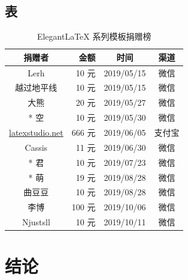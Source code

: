 \subsection{表}
\lipsum[3]
\begin{table}[!htbp]
    \centering
    \caption{Elegant\LaTeX{} 系列模板捐赠榜}
    \begin{tabular}{crcc}
      \toprule
      捐赠者   & 金额 & 时间 & 渠道 \\
      \midrule
      Lerh  & 10 元  & 2019/05/15 & 微信 \\
      越过地平线 & 10 元    & 2019/05/15 & 微信 \\
      大熊 &  20 元 & 2019/05/27 & 微信 \\
      * 空 & 10 元 & 2019/05/30 & 微信\\
      \href{http://www.latexstudio.net/}{latexstudio.net} & 666 元 & 2019/06/05 & 支付宝\\
      Cassis & 11 元 & 2019/06/30 & 微信\\
      * 君 & 10 元 & 2019/07/23 & 微信\\
      * 萌 & 19 元 & 2019/08/28 & 微信 \\
      曲豆豆 & 10 元 & 2019/08/28 & 微信 \\
      李博 & 100 元 & 2019/10/06 & 微信\\
      Njustsll & 10 元 & 2019/10/11 & 微信 \\
    \bottomrule
    \end{tabular}%
  \end{table}%
  \lipsum[4]
\clearpage
\section{结论}
